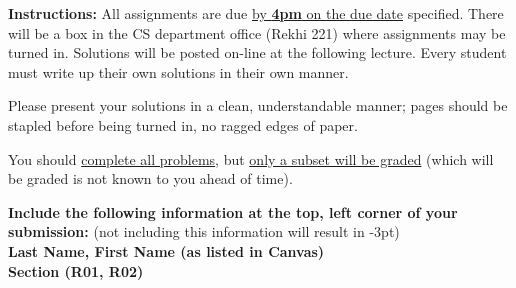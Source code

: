 \newcommand{\CMX}{\text{CMX}}
\newcommand{\ORD}{\text{ORD}}
\newcommand{\DTW}{\text{DTW}}
\newcommand{\MQT}{\text{MQT}}
\newcommand{\MSP}{\text{MSP}}


\extrawidth{0.5in} \extrafootheight{-0in} \pagestyle{headandfoot}
\headrule {} \footrule {}

\ifprintanswers
\else
\noindent \textbf{Instructions:} All assignments are due \underline{by \textbf{4pm} on the due date} specified.  There will be a box in the CS department office (Rekhi 221) where assignments may be turned in.  Solutions will be posted on-line at the following lecture.  Every student
must write up their own solutions in their own manner.

\medskip
\noindent Please present your solutions in a clean, understandable
manner; pages should be stapled before being turned in, no ragged edges of
paper.


\medskip
\noindent You should \underline{complete all problems}, but \underline{only a subset will be graded} (which will be graded is not known to you ahead of time). 

\medskip
\noindent \textbf{Include the following information at the top, left corner of your submission:} (not including this information will result in -3pt)\\
\textbf{Last Name, First Name (as listed in Canvas)} \\
\textbf{Section (R01, R02)}
\fi

